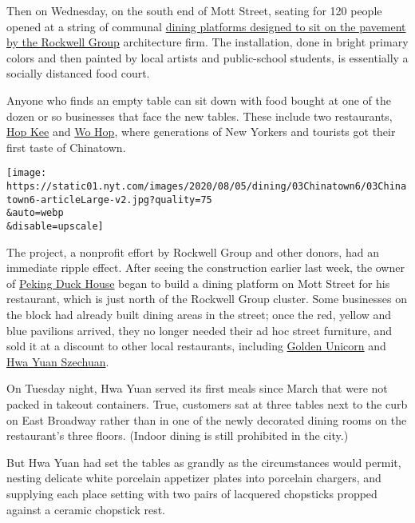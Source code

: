 Then on Wednesday, on the south end of Mott Street, seating for 120
people opened at a string of communal
\href{https://www.rockwellgroup.com/projects/dineout-nyc\#:~:text=Our\%20solution\%2C\%20DineOut\%20NYC\%2C\%20designed,to\%20feel\%20safe\%20and\%20comfortable.}{dining
platforms designed to sit on the pavement by the Rockwell Group}
architecture firm. The installation, done in bright primary colors and
then painted by local artists and public-school students, is essentially
a socially distanced food court.

Anyone who finds an empty table can sit down with food bought at one of
the dozen or so businesses that face the new tables. These include two
restaurants, \href{http://www.hop-kee-nyc.com/}{Hop Kee} and
\href{https://www.nytimes.com/2010/07/07/dining/reviews/07dinbriefs.html}{Wo
Hop}, where generations of New Yorkers and tourists got their first
taste of Chinatown.

\texttt{[image: https://static01.nyt.com/images/2020/08/05/dining/03Chinatown6/03Chinatown6-articleLarge-v2.jpg?quality=75\\\&auto=webp\\\&disable=upscale]}

The project, a nonprofit effort by Rockwell Group and other donors, had
an immediate ripple effect. After seeing the construction earlier last
week, the owner of \href{https://www.pekingduckhousenyc.com/}{Peking
Duck House} began to build a dining platform on Mott Street for his
restaurant, which is just north of the Rockwell Group cluster. Some
businesses on the block had already built dining areas in the street;
once the red, yellow and blue pavilions arrived, they no longer needed
their ad hoc street furniture, and sold it at a discount to other local
restaurants, including
\href{http://www.goldenunicornrestaurant.com/}{Golden Unicorn} and
\href{https://www.nytimes.com/2018/02/13/dining/hwa-yuan-szechuan-review-chinese-food.html}{Hwa
Yuan Szechuan}.

On Tuesday night, Hwa Yuan served its first meals since March that were
not packed in takeout containers. True, customers sat at three tables
next to the curb on East Broadway rather than in one of the newly
decorated dining rooms on the restaurant's three floors. (Indoor dining
is still prohibited in the city.)

But Hwa Yuan had set the tables as grandly as the circumstances would
permit, nesting delicate white porcelain appetizer plates into porcelain
chargers, and supplying each place setting with two pairs of lacquered
chopsticks propped against a ceramic chopstick rest.

